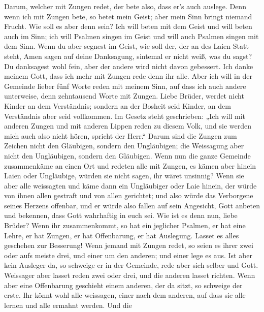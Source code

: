  Darum, welcher mit Zungen redet, der bete also, dass er's
auch auslege.  Denn wenn ich mit Zungen bete, so betet mein
Geist; aber mein Sinn bringt niemand Frucht.  Wie soll es
aber denn sein? Ich will beten mit dem Geist und will beten auch im
Sinn; ich will Psalmen singen im Geist und will auch Psalmen singen mit
dem Sinn.  Wenn du aber segnest im Geist, wie soll der, der
an des Laien Statt steht, Amen sagen auf deine Danksagung, sintemal er
nicht weiß, was du sagst?  Du danksagest wohl fein, aber
der andere wird nicht davon gebessert.  Ich danke meinem
Gott, dass ich mehr mit Zungen rede denn ihr alle.  Aber
ich will in der Gemeinde lieber fünf Worte reden mit meinem Sinn, auf
dass ich auch andere unterweise, denn zehntausend Worte mit Zungen.
 Liebe Brüder, werdet nicht Kinder an dem Verständnis;
sondern an der Bosheit seid Kinder, an dem Verständnis aber seid
vollkommen.  Im Gesetz steht geschrieben: „Ich will mit
anderen Zungen und mit anderen Lippen reden zu diesem Volk, und sie
werden mich auch also nicht hören, spricht der Herr.`` 
Darum sind die Zungen zum Zeichen nicht den Gläubigen, sondern den
Ungläubigen; die Weissagung aber nicht den Ungläubigen, sondern den
Gläubigen.  Wenn nun die ganze Gemeinde zusammenkäme an
einen Ort und redeten alle mit Zungen, es kämen aber hinein Laien oder
Ungläubige, würden sie nicht sagen, ihr wäret unsinnig? 
Wenn sie aber alle weissagten und käme dann ein Ungläubiger oder Laie
hinein, der würde von ihnen allen gestraft und von allen gerichtet;
 und also würde das Verborgene seines Herzens offenbar, und
er würde also fallen auf sein Angesicht, Gott anbeten und bekennen, dass
Gott wahrhaftig in euch sei.  Wie ist es denn nun, liebe
Brüder? Wenn ihr zusammenkommt, so hat ein jeglicher Psalmen, er hat
eine Lehre, er hat Zungen, er hat Offenbarung, er hat Auslegung. Lasset
es alles geschehen zur Besserung!  Wenn jemand mit Zungen
redet, so seien es ihrer zwei oder aufs meiste drei, und einer um den
anderen; und einer lege es aus.  Ist aber kein Ausleger da,
so schweige er in der Gemeinde, rede aber sich selber und Gott.
 Weissager aber lasset reden zwei oder drei, und die
anderen lasset richten.  Wenn aber eine Offenbarung
geschieht einem anderen, der da sitzt, so schweige der erste.
 Ihr könnt wohl alle weissagen, einer nach dem anderen, auf
dass sie alle lernen und alle ermahnt werden.  Und die

